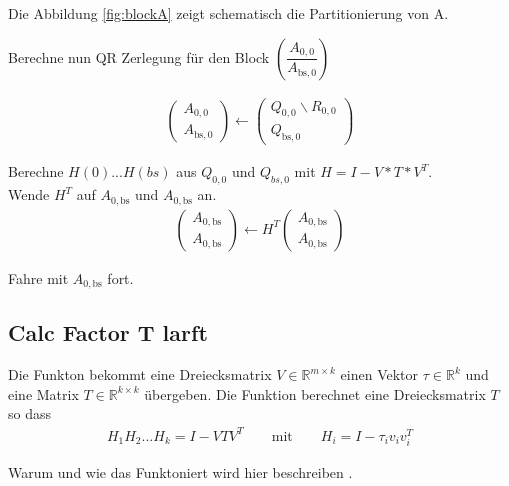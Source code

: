 Die Abbildung \ref{fig:blockA} zeigt schematisch die Partitionierung von A.

Berechne nun QR Zerlegung für den Block $
\left(\dfrac{A_{0, 0}}{A_{\text{bs}, 0}} \right)$


\begin{align}
	\left(\begin{array}{l} 
	A_{0, 0} \\ \hline
	A_{\text{bs}, 0}
	\end{array}\right)
	\leftarrow
	\left(\begin{array}{l} 
	Q_{0, 0}  \backslash R_{0,0} \\ \hline
	Q_{\text{bs}, 0} 
	\end{array}\right)
\end{align}



Berechne $H(0)$...$H(bs)$ aus $Q_{0, 0}$ und $Q_{bs, 0}$ mit $H = I - V*T*V^T$.\\
Wende $H^T$ auf $A_{0, \text{bs}}$ und $ A_{0,\text{bs}}$ an.
\begin{align}
	\left(\begin{array}{l} 
	A_{0, \text{bs}} \\ \hline
	A_{0, \text{bs}}
	\end{array}\right)
	\leftarrow
	H^T \left(\begin{array}{l} 
	A_{0, \text{bs}} \\ \hline
	A_{0, \text{bs}}
	\end{array}\right)
\end{align}



Fahre mit $A_{0, \text{bs}}$ fort.

\subsection{Calc Factor T larft}

Die Funkton bekommt eine Dreiecksmatrix $V \in \mathbb{R}^{m \times k}$ einen Vektor $\tau \in \mathbb{R}^k$ und eine Matrix $T\in \mathbb{R}^{k\times k}$ übergeben. 
Die Funktion berechnet eine Dreiecksmatrix $T$ so dass
\begin{align*}
	H_1H_2...H_k = I - VTV^T \qquad \text{mit}\qquad H_i = I - \tau_i v_iv_i^T
\end{align*}

Warum und wie das Funktoniert wird hier beschreiben \cite{Joffrain:2006:AHT:1141885.1141886}.

